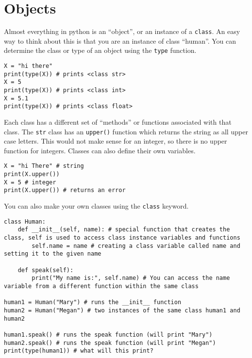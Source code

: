 \documentclass{assignments}
\begin{document}
\section*{Objects}
\label{sec:orgaf00036}
Almost everything in python is an ``object'', or an instance of a \texttt{class}. An easy
way to think about this is that you are an instance of class ``human''. You can
determine the class or type of an object using the \texttt{type} function.
\begin{verbatim}
X = "hi there"
print(type(X)) # prints <class str>
X = 5
print(type(X)) # prints <class int>
X = 5.1
print(type(X)) # prints <class float>
\end{verbatim}
Each class has a different set of ``methods'' or functions associated with that
class. The \texttt{str} class has an \texttt{upper()} function which returns the string as all
upper case letters. This would not make sense for an integer, so there is no
upper function for integers. Classes can also define their own variables.
\begin{verbatim}
X = "hi There" # string
print(X.upper())
X = 5 # integer
print(X.upper()) # returns an error
\end{verbatim}
You can also make your own classes using the \texttt{class} keyword.
\begin{verbatim}
class Human:
    def __init__(self, name): # special function that creates the class, self is used to access class instance variables and functions
        self.name = name # creating a class variable called name and setting it to the given name

    def speak(self):
        print("My name is:", self.name) # You can access the name variable from a different function within the same class

human1 = Human("Mary") # runs the __init__ function
human2 = Human("Megan") # two instances of the same class human1 and human2

human1.speak() # runs the speak function (will print "Mary")
human2.speak() # runs the speak function (will print "Megan")
print(type(human1)) # what will this print?
\end{verbatim}
\end{document}
